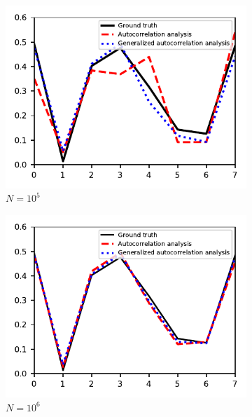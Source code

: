\documentclass{article}
\begin{document}
\begin{figure}[!tb]
	\begin{subfigure}[ht]{0.245\textwidth}
		\centering
		\includegraphics[width=\columnwidth]{figures/recovery_1.pdf}
		\caption{$N = 10^5$}
	\end{subfigure}
	\hfill
	\begin{subfigure}[ht]{0.245\textwidth}
		\centering
		\includegraphics[width=\columnwidth]{figures/recovery_2.pdf}
		\caption{$N = 10^6$}
	\end{subfigure}
	\hfill
	\begin{subfigure}[ht]{0.245\textwidth}
		\centering

\end{subfigure}
\end{figure}
\end{document}
